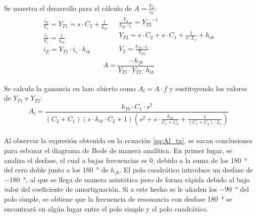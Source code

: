 \paragraph{}
Se muestra el desarrollo para el c\'alculo de $A = \frac{V_2}{i_E}$:
\[
\begin{array}{rl} 
      \begin{array}{l}
   \frac{i_E}{V_1} = Y_{T1} = s\cdot C_2 + \frac{1}{h_{ib}} \\
   \frac{i_e}{V_{1}} = \frac{1}{h_{ib}} \\
   i_E = Y_{T1} \cdot i_e \cdot h_{ib}
      \end{array}
      &
      \begin{array}{r}
   \frac{V_2}{h_{fb}\cdot i_e} = {Y_{T2}}^{-1} \\
   Y_{T2} = s\cdot C_2 + s\cdot C_1 + \frac{1}{s\cdot L_1} + h_{ob} \\
   V_2 = \frac{h_{fb}\cdot i_e}{Y_{T2}} 
      \end{array}
\end{array}
\]
\begin{equation}
   A = \frac{-h_{fb}}{Y_{T1} \cdot Y_{T2} \cdot h_{ib}} 
\end{equation}
\paragraph{}
Se calcula la ganancia en lazo abierto como $A_l = A \cdot f$ y sustituyendo los valores de $Y_{T1}$ e $Y_{T2}$:
\begin{equation}
   \label{eq:Al_tx}
   A_l = \frac{h_{fb} \cdot C_1 \cdot s^2}{ \left( C_2+C_1 \right) \left( s \cdot h_{ib} \cdot C_2 + 1\right) \left( s^2 + s \cdot \frac{h_{ob}}{C_1 + C_2} + \frac{1}{(C_1 + C_2)\cdot L_1}\right) }
\end{equation}
\paragraph{}
Al observar la expresi\'on obtenida en la ecuaci\'on \ref{eq:Al_tx}, se sacan conclusiones para esbozar el diagrama de Bode de manera anal\'itica. En primer lugar, se analiza el desfase, el cual a bajas frecuencias es 0, debido a la suma de los \SI{180}{\degree} del cero doble junto a los \SI{180}{\degree} de $h_{fb}$. El polo cuadr\'atico introduce un desfase de \SI{-180}{\degree}, al que se llega de manera asint\'otica pero de forma r\'apida debido al bajo valor del coeficiente de amortiguaci\'on. Si a este hecho se le añaden los \SI{-90}{\degree} del polo simple, se obtiene que la frecuencia de resonancia con desfase \SI{180}{\degree} se encontrará en algún lugar entre el polo simple y el polo cuadrático.
